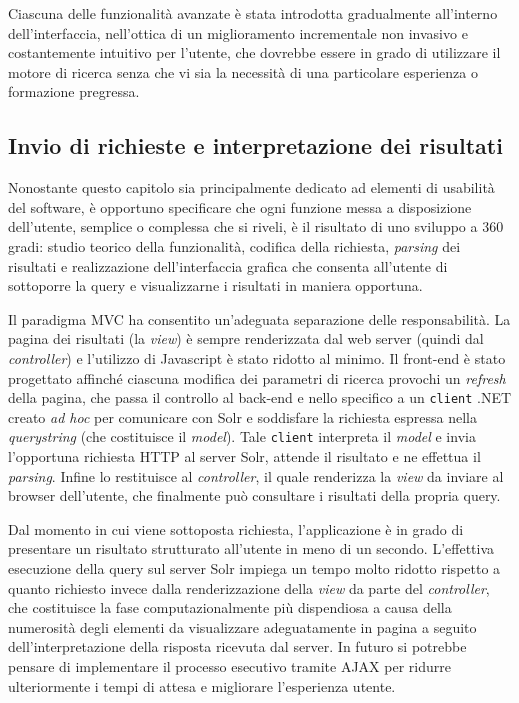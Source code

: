 \vspace{1em}

Ciascuna delle funzionalità avanzate è stata introdotta gradualmente all’interno dell’interfaccia, nell’ottica di un miglioramento incrementale non invasivo e costantemente intuitivo per l’utente, che dovrebbe essere in grado di utilizzare il motore di ricerca senza che vi sia la necessità di una particolare esperienza o formazione pregressa.



\subsection{Invio di richieste e interpretazione dei risultati}

Nonostante questo capitolo sia principalmente dedicato ad elementi di usabilità del software, è opportuno specificare che ogni funzione messa a disposizione dell’utente, semplice o complessa che si riveli, è il risultato di uno sviluppo a 360 gradi: studio teorico della funzionalità, codifica della richiesta, \textit{parsing} dei risultati e realizzazione dell’interfaccia grafica che consenta all’utente di sottoporre la query e visualizzarne i risultati in maniera opportuna.

\vspace{1em}

Il paradigma MVC ha consentito un’adeguata separazione delle responsabilità. La pagina dei risultati (la \textit{view}) è sempre renderizzata dal web server (quindi dal \textit{controller}) e l’utilizzo di Javascript è stato ridotto al minimo. Il front-end è stato progettato affinché ciascuna modifica dei parametri di ricerca provochi un \textit{refresh} della pagina, che passa il controllo al back-end e nello specifico a un \texttt{client} .NET creato \textit{ad hoc} per comunicare con Solr e soddisfare la richiesta espressa nella \textit{querystring} (che costituisce il \textit{model}). Tale \texttt{client} interpreta il \textit{model} e invia l’opportuna richiesta HTTP al server Solr, attende il risultato e ne effettua il \textit{parsing}. Infine lo restituisce al \textit{controller}, il quale renderizza la \textit{view} da inviare al browser dell’utente, che finalmente può consultare i risultati della propria query.

Dal momento in cui viene sottoposta richiesta, l’applicazione è in grado di presentare un risultato strutturato all’utente in meno di un secondo. L’effettiva esecuzione della query sul server Solr impiega un tempo molto ridotto rispetto a quanto richiesto invece dalla renderizzazione della \textit{view} da parte del \textit{controller}, che costituisce la fase computazionalmente più dispendiosa a causa della numerosità degli elementi da visualizzare adeguatamente in pagina a seguito dell’interpretazione della risposta ricevuta dal server. In futuro si potrebbe pensare di implementare il processo esecutivo tramite AJAX per ridurre ulteriormente i tempi di attesa e migliorare l’esperienza utente.



